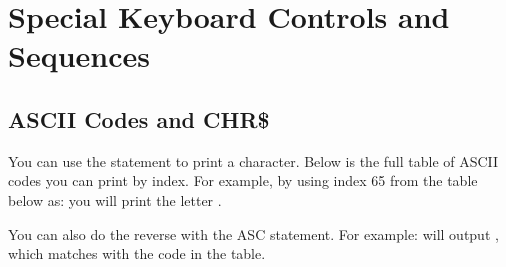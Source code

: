 
\chapter{Special Keyboard Controls and Sequences}


\section{ASCII Codes and CHR\$}

\label{appendix:asciicodes}

You can use the  statement to print a character.
Below is the full table of ASCII codes you can print by index.  For example, by
using index 65 from the table below as:  you will
print the letter .

You can also do the reverse with the ASC statement.  For example:
 will output , which matches with the
code in the table.


